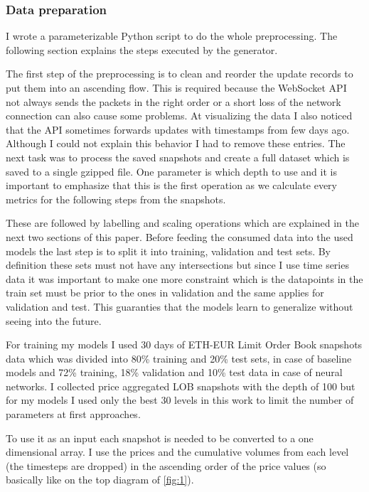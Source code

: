 \documentclass[11pt,a4paper,oneside]{article}
\begin{document}
  \subsubsection{Data preparation}
  \label{dataprep}

  I wrote a parameterizable Python script to do the whole preprocessing. The following section explains the steps 
  executed by the generator.

  The first step of the preprocessing is to clean and reorder the update records to put them into an ascending flow. 
  This is required because the WebSocket API not always sends the packets in the right order or a short loss of the 
  network connection can also cause some problems. At visualizing the data I also noticed that the API sometimes 
  forwards updates with timestamps from few days ago. Although I could not explain this behavior I had to remove these 
  entries. The next task was to process the saved snapshots and create a full dataset which is saved to a single gzipped 
  file. One parameter is which depth to use and it is important to emphasize that this is the first operation as we 
  calculate every metrics for the following steps from the snapshots. 

  These are followed by labelling and scaling operations which are explained in the next 
  two sections of this paper. Before feeding the consumed data into the used models the last step is to split it into 
  training, validation and test sets. By definition these sets must not have any intersections but since I use time 
  series data it was important to make one more constraint which is the datapoints in the train set must be prior to the 
  ones in validation and the same applies for validation and test. This guaranties that the models learn to generalize 
  without seeing into the future. 

  For training my models I used 30 days of ETH-EUR Limit Order Book snapshots data which was divided into 80\% training 
  and 20\% test sets, in case of baseline models and 72\% training, 18\% validation and 10\% test data in case of neural 
  networks. I collected price aggregated LOB snapshots with the depth of 100 but for my models I used only the best 30 
  levels in this work to limit the number of parameters at first approaches. 

  To use it as an input each snapshot is needed to be converted to a one dimensional array. I use the prices and the 
  cumulative volumes from each level (the timesteps are dropped) in the ascending order of the price values (so 
  basically like on the top diagram of \autoref{fig:1}). 
\end{document}

